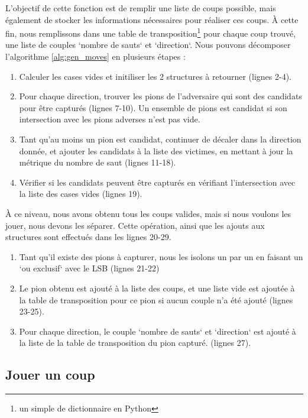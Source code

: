 L'objectif de cette fonction est de remplir une liste de coups possible, mais également de stocker les informations nécessaires pour réaliser ces coups. À cette fin, nous remplissons dans une table de transposition\footnote{un simple de dictionnaire en Python} pour chaque coup trouvé, une liste de couples `nombre de sauts` et `direction`. Nous pouvons décomposer l'algorithme \ref{alg:gen_moves} en plusieurs étapes :
\begin{enumerate}
    \item Calculer les cases vides et initiliser les 2 structures à retourner (lignes 2-4).
    \item Pour chaque direction, trouver les pions de l'adversaire qui sont des candidats pour être capturés (lignes 7-10). Un ensemble de pions est candidat si son intersection avec les pions adverses n'est pas vide.
    \item Tant qu'au moins un pion est candidat, continuer de décaler dans la direction donnée, et ajouter les candidats à la liste des victimes, en mettant à jour la métrique du nombre de saut (lignes 11-18).
    \item Vérifier si les candidats peuvent être capturés en vérifiant l'intersection avec la liste des cases vides (lignes 19).
\end{enumerate}
À ce niveau, nous avons obtenu tous les coups valides, mais si nous voulons les jouer, nous devons les séparer. Cette opération, ainsi que les ajouts aux structures sont effectués dans les lignes 20-29.
\begin{enumerate}
    \item Tant qu'il existe des pions à capturer, nous les isolons un par un en faisant un `ou exclusif` avec le \ac{LSB} (lignes 21-22)
    \item Le pion obtenu est ajouté à la liste des coups, et une liste vide est ajoutée à la table de transposition pour ce pion si aucun couple n'a été ajouté (lignes 23-25).
    \item Pour chaque direction, le couple `nombre de sauts` et `direction` est ajouté à la liste de la table de transposition du pion capturé. (lignes 27).
\end{enumerate}

\subsection{Jouer un coup}
\label{subsec:play}

